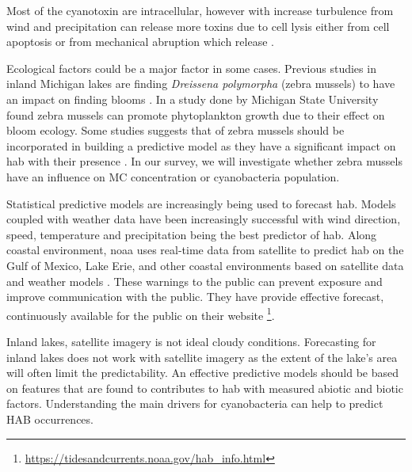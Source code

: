 Most of the cyanotoxin are intracellular, however with increase turbulence from wind and precipitation can release more toxins due to cell lysis either from cell apoptosis or from mechanical abruption which release \cite{rohrlack_fate_2007}. %


Ecological factors could be a major factor in some cases. Previous studies in inland Michigan lakes are finding \emph{Dreissena polymorpha} (zebra mussels) to have an impact on finding blooms \cite{vanderploeg_zebra_2001}.
In a study done by Michigan State University \cite{raikow_dominance_2004} found zebra mussels can promote phytoplankton growth due to their effect on bloom ecology. Some studies suggests that of zebra mussels should be incorporated in building a predictive model as they have a significant impact on \gls{hab} with their presence \cite{lavrentyev_effects_1995, knoll_invasive_2008, raikow_dominance_2004}. In our survey, we will investigate whether zebra mussels have an influence on MC concentration or cyanobacteria population.



Statistical predictive models are increasingly being used to forecast \gls{hab}. Models coupled with weather data have been increasingly successful with wind direction, speed, temperature and precipitation being the best predictor of \gls{hab}. Along coastal environment,   \gls{noaa} uses real-time data from satellite to predict \gls{hab} on the Gulf of Mexico, Lake Erie, and other coastal environments based on satellite data and weather models \cite{kavanaugh_assessment_2013}.
These warnings to the public can prevent exposure and improve communication with the public. They have provide effective forecast, continuously available for the public on their website \footnote{\url{https://tidesandcurrents.noaa.gov/hab_info.html}}. %

Inland lakes, satellite imagery is not ideal cloudy conditions. Forecasting for inland lakes does not work with satellite imagery as the extent of the lake's area will often limit the predictability.
An effective predictive models should be based on features that are found to contributes to \gls{hab} with measured abiotic and biotic factors.
Understanding the main drivers for cyanobacteria can help to predict HAB occurrences.




